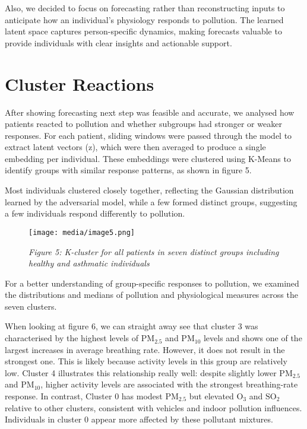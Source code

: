 \documentclass[12pt,a4paper]{report}
\begin{document}
Also, we decided to focus on forecasting rather than reconstructing
inputs to anticipate how an individual's physiology responds to
pollution. The learned latent space captures person-specific dynamics,
making forecasts valuable to provide individuals with clear insights and
actionable support.

\section{Cluster Reactions}
After showing forecasting next step was feasible and accurate, we
analysed how patients reacted to pollution and whether subgroups had
stronger or weaker responses. For each patient, sliding windows were
passed through the model to extract latent vectors (z), which were then
averaged to produce a single embedding per individual. These embeddings
were clustered using K-Means to identify groups with similar response
patterns, as shown in figure 5.

Most individuals clustered closely together, reflecting the Gaussian
distribution learned by the adversarial model, while a few formed
distinct groups, suggesting a few individuals respond differently to pollution.

\begin{figure}[h!]
    \centering
    \texttt{[image: media/image5.png]}
    \caption*{\emph{Figure 5: K-cluster for all patients in seven distinct groups
    including healthy and asthmatic individuals}}
\end{figure}


For a better understanding of group-specific responses to pollution, we
examined the distributions and medians of pollution and physiological
measures across the seven clusters.

When looking at figure 6, we can straight away see that cluster 3 was characterised by the
highest levels of $\mathrm{PM}_{2.5}$ and $\mathrm{PM}_{10}$
levels and shows one of the largest increases in
average breathing rate. However, it does not result in the strongest
one. This is likely because activity levels in this group are relatively
low. Cluster 4 illustrates this relationship really well: despite
slightly lower $\mathrm{PM}_{2.5}$ and $\mathrm{PM}_{10}$, higher activity levels are associated with
the strongest breathing-rate response. In contrast, Cluster 0 has modest
$\mathrm{PM}_{2.5}$  but elevated $\mathrm{O}_{3}$ and $\mathrm{SO}_{2}$ relative to other clusters, consistent
with vehicles and indoor pollution influences. Individuals in cluster 0
appear more affected by these pollutant mixtures.
\end{document}
